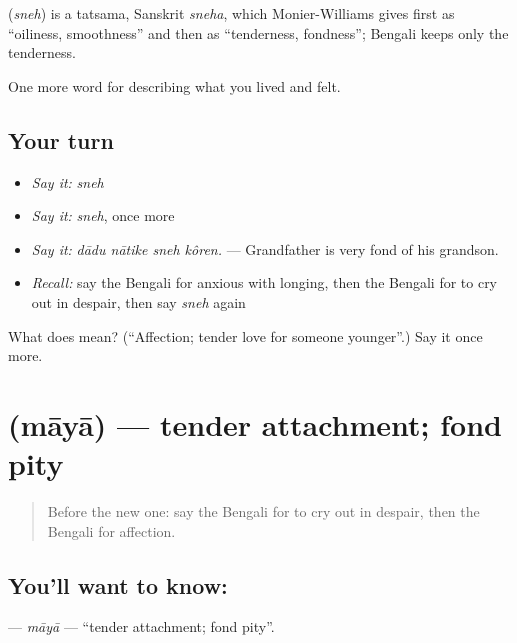 \begin{cousinweb}
\textbf{} (\emph{sneh}) is a tatsama, Sanskrit \emph{sneha}, which Monier-Williams gives first as \textquotedblleft{}oiliness, smoothness\textquotedblright{} and then as \textquotedblleft{}tenderness, fondness\textquotedblright{}; Bengali keeps only the tenderness.
\end{cousinweb}

\begin{grammarlens}[title={What you've built}]
One more word for describing what you lived and felt.
\end{grammarlens}

\subsection*{Your turn}
\begin{itemize}
\raggedright
  \item \emph{Say it:} \emph{sneh}
  \item \emph{Say it:} \emph{sneh}, once more
  \item \emph{Say it:} \emph{dādu nātike sneh kôren.} — Grandfather is very fond of his grandson.
  \item \emph{Recall:} say the Bengali for anxious with longing, then the Bengali for to cry out in despair, then say \emph{sneh} again
\end{itemize}

\begin{tcolorbox}[breakable,colback=teal!4,colframe=teal!35!black,title={Before you move on}]
What does  mean? (\textquotedblleft{}Affection; tender love for someone younger\textquotedblright{}.) Say it once more.
\end{tcolorbox}
\section[\texorpdfstring{\bn{মায়া} (māyā)}{মায়া (māyā)}]{ (māyā) — tender attachment; fond pity}

\label{lesson:BN-C449-maya}



\begin{quote}
Before the new one: say the Bengali for to cry out in despair, then the Bengali for affection.
\end{quote}

\subsection*{You'll want to know: }
\textbf{} — \emph{māyā} — \textquotedblleft{}tender attachment; fond pity\textquotedblright{}.

